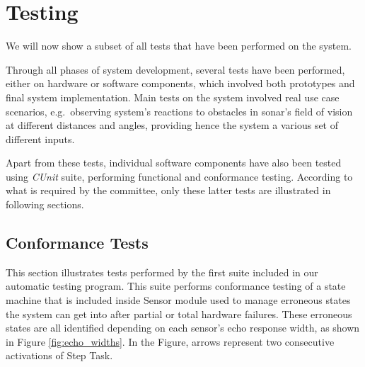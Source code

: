 \chapter{Testing}


We will now show a subset of all tests that have been performed on the system. 

Through all phases of system development, several tests have been performed, either on hardware or software components, which involved both prototypes and final system implementation. Main tests on the system involved real use case scenarios, e.g.\ observing system's reactions to obstacles in sonar's field of vision at different distances and angles, providing hence the system a various set of different inputs.

Apart from these tests, individual software components have also been tested using {\em CUnit} suite, performing functional and conformance testing. According to what is required by the committee, only these latter tests are illustrated in following sections.


\section{Conformance Tests}

This section illustrates tests performed by the first suite included in our automatic testing program. This suite performs conformance testing of a state machine that is included inside Sensor module used to manage erroneous states the system can get into after partial or total hardware failures. These erroneous states are all identified depending on each sensor's echo response width, as shown in Figure \ref{fig:echo_widths}. In the Figure, arrows represent two consecutive activations of Step Task.






